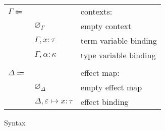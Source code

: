 \documentclass[12pt]{article}
\newcommand\anno[2]{#1 : #2}
\newcommand\evar{x}
\newcommand\type{\tau}
\newcommand\tvar{\alpha}
\newcommand\effect{\varepsilon}
\newcommand\kind{\kappa}
\newcommand\context{\Gamma}
\newcommand\cempty{\varnothing_{\context}}
\newcommand\cextend[2]{#1, #2}
\newcommand\effectmap{\Delta}
\newcommand\emempty{\varnothing_{\effectmap}}
\newcommand\emmap[2]{#1 \mapsto #2}
\newcommand\emextend[2]{#1, #2}
\begin{document}
\begin{figure}
\begin{mdframed}[backgroundcolor=none]
\begin{center}
\begin{tabular}{l l l}
          $\context \Coloneqq$ & & contexts: \\
          & $\cempty$ & empty context \\
          & $\cextend{\context}{\anno{\evar}{\type}}$ & term variable binding \\
          & $\cextend{\context}{\anno{\tvar}{\kind}}$ & type variable binding \\
          \\
          $\effectmap \Coloneqq$ & & effect map: \\
          & $\emempty$ & empty effect map \\
          & $\emextend{\effectmap}{\emmap{\effect}{\anno{\evar}{\type}}}$ & effect binding \\
        \end{tabular}
      \end{center}

      \caption{Syntax}\label{fig:syntax}
    \end{mdframed}
  \end{figure}
\end{document}
